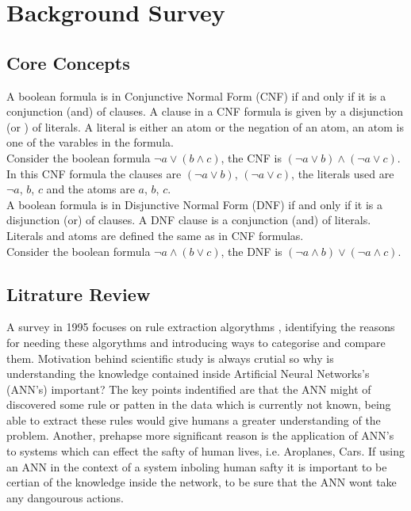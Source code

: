 \chapter{Background Survey}\label{C:backgroundsurvey}
\section{Core Concepts}
A boolean formula is in Conjunctive Normal Form (CNF) if and only if it is a conjunction (and) of clauses. A clause in a CNF formula is given by a disjunction (or ) of literals. A literal is either an atom or the negation of an atom, an atom is one of the varables in the formula.\\

Consider the boolean formula $\lnot a \lor (b \land c)$, the CNF is $(\lnot a \lor b) \land (\lnot a \lor c)$. In this CNF formula the clauses are $(\lnot a \lor b)$, $(\lnot a \lor c)$, the literals used are $\lnot a$, $b$, $c$ and the atoms are $a$, $b$, $c$.\\

A boolean formula is in Disjunctive Normal Form (DNF) if and only if it is a disjunction (or) of clauses. A DNF clause is a conjunction (and) of literals. Literals and atoms are defined the same as in CNF formulas.\\

Consider the boolean formula $\lnot a \land (b \lor c)$, the DNF is $(\lnot a \land b) \lor (\lnot a \land c)$.\\


\section{Litrature Review}

A survey in 1995 focuses on rule extraction algorythms \cite{andrews1995survey}, identifying the reasons for needing these algorythms and introducing ways to categorise and compare them. Motivation behind scientific study is always crutial so why is understanding the knowledge contained inside Artificial Neural Networks's (ANN's) important? The key points indentified are that the ANN might of discovered some rule or patten in the data which is currently not known, being able to extract these rules would give humans a greater understanding of the problem. Another, prehapse more significant reason is the application of ANN's to systems which can effect the safty of human lives, i.e. Aroplanes, Cars. If using an ANN in the context of a system inboling human safty it is important to be certian of the knowledge inside the network, to be sure that the ANN wont take any dangourous actions.\\

